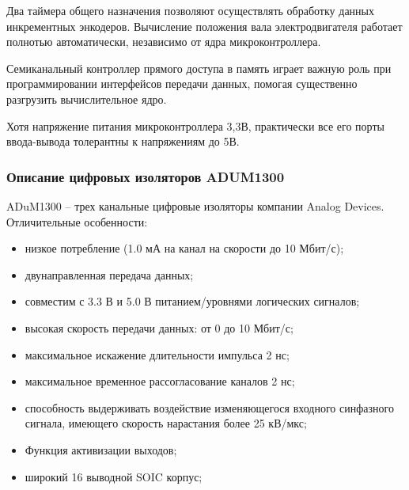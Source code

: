         Два таймера общего назначения позволяют осуществлять обработку данных
        инкрементных энкодеров. Вычисление положения вала электродвигателя
        работает полнотью автоматически, независимо от ядра микроконтроллера.

        Семиканальный контроллер прямого доступа в память играет важную роль при
        программировании интерфейсов передачи данных, помогая существенно разгрузить
        вычислительное ядро.

        Хотя напряжение питания микроконтроллера 3,3В, практически все его
        порты ввода-вывода толерантны к напряжениям до 5В.

    \subsubsection{Описание цифровых изоляторов ADUM1300}
        ADuM1300 – трех канальные цифровые изоляторы компании Analog Devices.
        Отличительные особенности:
        \begin{itemize}
            \item низкое потребление (1.0 мА на канал на скорости до 10
                Мбит/с);
            \item двунаправленная передача данных;
            \item совместим с 3.3 В и 5.0 В питанием/уровнями логических
                сигналов;
            \item высокая скорость передачи данных: от 0 до 10 Мбит/с;
            \item максимальное искажение длительности импульса 2 нс;
            \item максимальное временное рассогласование каналов 2 нс;
            \item способность выдерживать воздействие изменяющегося входного
                синфазного сигнала, имеющего скорость нарастания более 25
                кВ/мкс;
            \item Функция активизации выходов;
            \item широкий 16 выводной SOIC корпус;
        \end{itemize}


